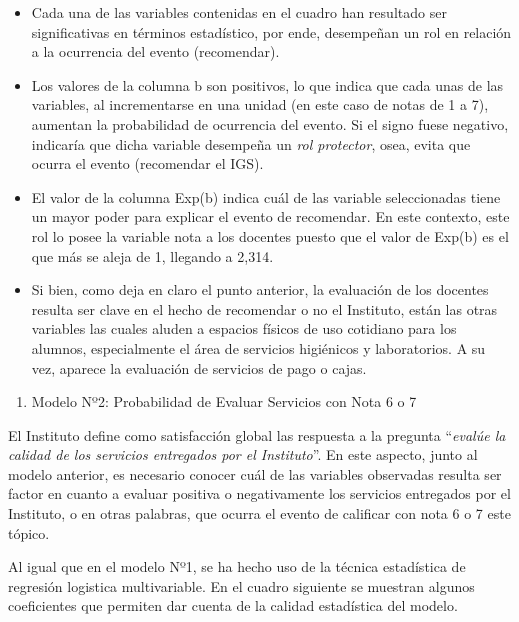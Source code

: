 \documentclass[]{book}
\providecommand{\tightlist}{%
  \setlength{\itemsep}{0pt}\setlength{\parskip}{0pt}}
\begin{document}
\begin{itemize}
\item
  Cada una de las variables contenidas en el cuadro han resultado ser
  significativas en términos estadístico, por ende, desempeñan un rol en
  relación a la ocurrencia del evento (recomendar).
\item
  Los valores de la columna b son positivos, lo que indica que cada unas
  de las variables, al incrementarse en una unidad (en este caso de
  notas de 1 a 7), aumentan la probabilidad de ocurrencia del evento. Si
  el signo fuese negativo, indicaría que dicha variable desempeña un
  \emph{rol protector}, osea, evita que ocurra el evento (recomendar el
  IGS).
\item
  El valor de la columna Exp(b) indica cuál de las variable
  seleccionadas tiene un mayor poder para explicar el evento de
  recomendar. En este contexto, este rol lo posee la variable nota a los
  docentes puesto que el valor de Exp(b) es el que más se aleja de 1,
  llegando a 2,314.
\item
  Si bien, como deja en claro el punto anterior, la evaluación de los
  docentes resulta ser clave en el hecho de recomendar o no el
  Instituto, están las otras variables las cuales aluden a espacios
  físicos de uso cotidiano para los alumnos, especialmente el área de
  servicios higiénicos y laboratorios. A su vez, aparece la evaluación
  de servicios de pago o cajas.
\end{itemize}

\begin{enumerate}
\def\labelenumi{\alph{enumi})}
\setcounter{enumi}{1}
\tightlist
\item
  Modelo Nº2: Probabilidad de Evaluar Servicios con Nota 6 o 7
\end{enumerate}

El Instituto define como satisfacción global las respuesta a la pregunta
``\emph{evalúe la calidad de los servicios entregados por el
Instituto}''. En este aspecto, junto al modelo anterior, es necesario
conocer cuál de las variables observadas resulta ser factor en cuanto a
evaluar positiva o negativamente los servicios entregados por el
Instituto, o en otras palabras, que ocurra el evento de calificar con
nota 6 o 7 este tópico.

Al igual que en el modelo Nº1, se ha hecho uso de la técnica estadística
de regresión logistica multivariable. En el cuadro siguiente se muestran
algunos coeficientes que permiten dar cuenta de la calidad estadística
del modelo.
\end{document}
